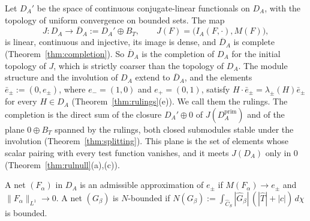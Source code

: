\documentclass[11pt]{amsart}
\theoremstyle{definition}
\theoremstyle{remark}
\begin{document}
Let $D_A'$ be the space of continuous conjugate-linear functionals on $D_A$,
with the topology of uniform convergence on bounded sets.  The map
\[
J:D_A\longrightarrow\overline{D}_A:=D_A'\oplus B_T,\qquad
J(F)=\bigl(I_A(F,\cdot),M(F)\bigr),
\]
is linear, continuous and injective, its image is dense, and $\overline{D}_A$
is complete (Theorem~\ref{thm:completion}).  So $\overline{D}_A$ is the
completion of $D_A$ for the initial topology of $J$, which is strictly
coarser than the topology of $D_A$.  The module structure and the involution
of $D_A$ extend to $\overline{D}_A$, and the elements
$\bar e_{\pm}:=(0,e_{\pm})$, where $e_-=(1,0)$ and $e_+=(0,1)$, satisfy
$H\cdot\bar e_{\pm}=\lambda_{\pm}(H)\bar e_{\pm}$ for every $H\in D_A$
(Theorem~\ref{thm:rulings}(e)).  We call them the rulings.  The completion is
the direct sum of the closure $D_A'\oplus0$ of $J(D_A^{\mathrm{prim}})$ and of
the plane $0\oplus B_T$ spanned by the rulings, both closed submodules stable
under the involution (Theorem~\ref{thm:splitting}).  This plane is the set of
elements whose scalar pairing with every test function vanishes, and it meets
$J(D_A)$ only in $0$ (Theorem~\ref{thm:rulnull}(a),(c)).

A net $(F_{\alpha})$ in $D_A$ is an admissible approximation of $e_{\pm}$ if
$M(F_{\alpha})\to e_{\pm}$ and $\lVert F_{\alpha}\rVert_{L^{1}}\to0$.  A net
$(G_{\beta})$ is $N$-bounded if
$N(G_{\beta}):=\int_{\widehat C_S}|\widehat G_{\beta}|\,(|\widehat T|+|c|)\,
d\chi$ is bounded.
\end{document}
